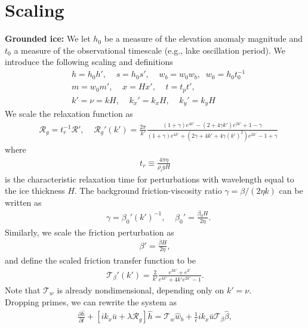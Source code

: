 \documentclass[paper=a4, fontsize=11pt]{article}
\begin{document}
\section*{Scaling}
\textbf{Grounded ice:}
We let $h_0$ be a measure of the elevation anomaly magnitude and
$t_0$ a measure of the observational timescale (e.g., lake oscillation period).
We introduce the following scaling and definitions
\begin{align}
& h = h_0 h', \;\;\;\; s = h_0 s',\;\;\;\; w_b = w_0 w_{b} , \;\; w_0 = h_0 t_0^{-1} \\
& m = w_0 m',\;\;\;\; x = Hx', \;\;\;\;
t = t_p t', \;\;\;\;\\
& k' = \nu = kH , \;\;\;\; k_x' = k_x H,\;\;\;\; k_y' = k_y H
\end{align}
We scale the relaxation function as
\begin{align}
   &\mathcal{R}_g = t_r^{-1} \mathcal{R}', \;\;\;\;
 \mathcal{R}_g'(k') =  \frac{2\pi}{k'}\frac{ (1+\gamma)e^{4k'} -(2+4\gamma k')e^{2 k'} +1-\gamma  }{ (1+\gamma)e^{4 k'} + (2\gamma+4 k'+4\gamma (k')^2)e^{2 k'} -1 + \gamma  }
\end{align}
where
\begin{align}
t_r \equiv \frac{4\pi\eta}{\rho_i g H}
\end{align}
is the characteristic relaxation time for perturbations with wavelength equal to the ice thickness $H$.
The background friction-viscosity ratio $\gamma=\beta/(2\eta k)$ can be written as
\begin{align}
   &\gamma = \beta_0' (k')^{-1}, \;\;\;\; \beta_0' = \frac{\beta_0 H}{2\eta}.
\end{align}
Similarly, we scale the friction perturbation as
\begin{align}
\beta' = \frac{ \beta H}{2\eta},
\end{align}
and define the scaled friction transfer function to be
\begin{align}
\mathcal{T}_{\beta}'(k') =  \frac{2}{k'}\frac{e^{3k'} + e^{k'}}{e^{4 k'} +4 k' e^{2 k'} -1 }.
\end{align}
Note that $\mathcal{T}_w$ is already nondimensional, depending only on $k' = \nu$.
\\
Dropping primes, we can rewrite the system as
\begin{align}
\frac{\partial \widehat{h}}{\partial t} +\left[ik_x \bar{u} + \lambda\mathcal{R}_g \right]\widehat{h} = \mathcal{T}_w\widehat{w}_b +  \tfrac{1}{\epsilon} {ik_x\bar{u}}\mathcal{T}_{\beta}\widehat{\beta}, \label{dhhatsc}
\end{align}
\end{document}

